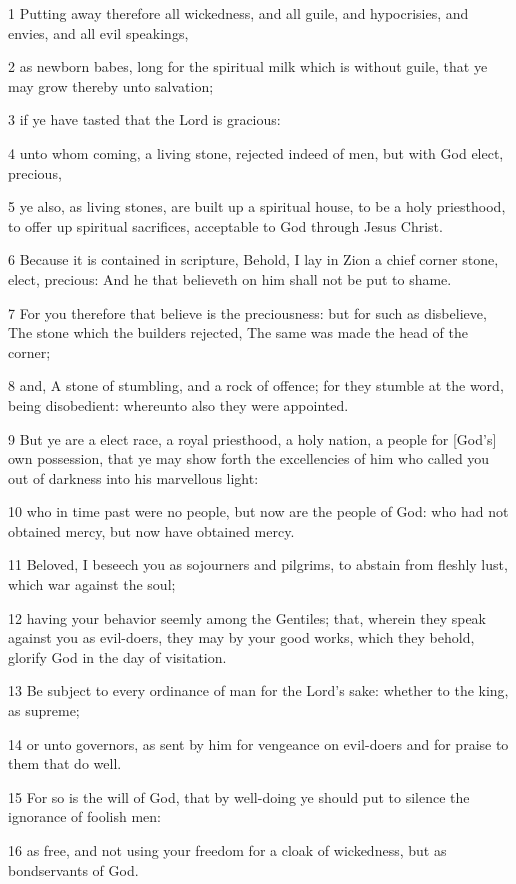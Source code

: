 \par 1 Putting away therefore all wickedness, and all guile, and hypocrisies, and envies, and all evil speakings,
\par 2 as newborn babes, long for the spiritual milk which is without guile, that ye may grow thereby unto salvation;
\par 3 if ye have tasted that the Lord is gracious:
\par 4 unto whom coming, a living stone, rejected indeed of men, but with God elect, precious,
\par 5 ye also, as living stones, are built up a spiritual house, to be a holy priesthood, to offer up spiritual sacrifices, acceptable to God through Jesus Christ.
\par 6 Because it is contained in scripture, Behold, I lay in Zion a chief corner stone, elect, precious: And he that believeth on him shall not be put to shame.
\par 7 For you therefore that believe is the preciousness: but for such as disbelieve, The stone which the builders rejected, The same was made the head of the corner;
\par 8 and, A stone of stumbling, and a rock of offence; for they stumble at the word, being disobedient: whereunto also they were appointed.
\par 9 But ye are a elect race, a royal priesthood, a holy nation, a people for [God's] own possession, that ye may show forth the excellencies of him who called you out of darkness into his marvellous light:
\par 10 who in time past were no people, but now are the people of God: who had not obtained mercy, but now have obtained mercy.
\par 11 Beloved, I beseech you as sojourners and pilgrims, to abstain from fleshly lust, which war against the soul;
\par 12 having your behavior seemly among the Gentiles; that, wherein they speak against you as evil-doers, they may by your good works, which they behold, glorify God in the day of visitation.
\par 13 Be subject to every ordinance of man for the Lord's sake: whether to the king, as supreme;
\par 14 or unto governors, as sent by him for vengeance on evil-doers and for praise to them that do well.
\par 15 For so is the will of God, that by well-doing ye should put to silence the ignorance of foolish men:
\par 16 as free, and not using your freedom for a cloak of wickedness, but as bondservants of God.
